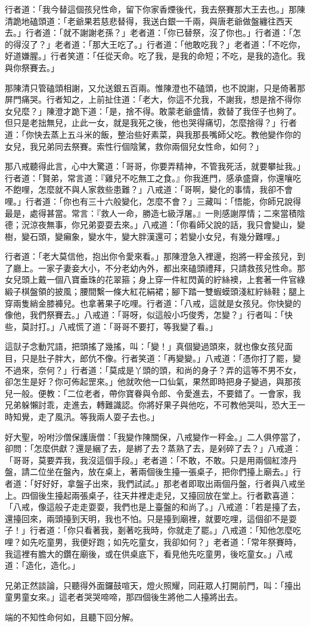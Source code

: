 行者道：「我今替這個孩兒性命，留下你家香煙後代，我去祭賽那大王去也。」那陳清跪地磕頭道：「老爺果若慈悲替得，我送白銀一千兩，與唐老爺做盤纏往西天去。」行者道：「就不謝謝老孫？」老者道：「你已替祭，沒了你也。」行者道：「怎的得沒了？」老者道：「那大王吃了。」行者道：「他敢吃我？」老者道：「不吃你，好道嫌腥。」行者笑道：「任從天命。吃了我，是我的命短；不吃，是我的造化。我與你祭賽去。」

那陳清只管磕頭相謝，又允送銀五百兩。惟陳澄也不磕頭，也不說謝，只是倚著那屏門痛哭。行者知之，上前扯住道：「老大，你這不允我，不謝我，想是捨不得你女兒麼？」陳澄才跪下道：「是，捨不得。敢蒙老爺盛情，救替了我侄子也夠了。但只是老拙無兒，止此一女，就是我死之後，他也哭得痛切，怎麼捨得？」行者道：「你快去蒸上五斗米的飯，整治些好素菜，與我那長嘴師父吃。教他變作你的女兒，我兄弟同去祭賽。索性行個陰騭，救你兩個兒女性命，如何？」

那八戒聽得此言，心中大驚道：「哥哥，你要弄精神，不管我死活，就要攀扯我。」行者道：「賢弟，常言道：『雞兒不吃無工之食。』你我進門，感承盛齋，你還嚷吃不飽哩，怎麼就不與人家救些患難？」八戒道：「哥啊，變化的事情，我卻不會哩。」行者道：「你也有三十六般變化，怎麼不會？」三藏叫：「悟能，你師兄說得最是，處得甚當。常言：『救人一命，勝造七級浮屠。』一則感謝厚情；二來當積陰德；況涼夜無事，你兄弟耍耍去來。」八戒道：「你看師父說的話，我只會變山，變樹，變石頭，變癩象，變水牛，變大胖漢還可；若變小女兒，有幾分難哩。」

行者道：「老大莫信他，抱出你令愛來看。」那陳澄急入裡邊，抱將一秤金孩兒，到了廳上。一家子妻妾大小，不分老幼內外，都出來磕頭禮拜，只請救孩兒性命。那女兒頭上戴一個八寶垂珠的花翠箍；身上穿一件紅閃黃的紵絲襖，上套著一件官綠緞子棋盤領的披風；腰間繫一條大紅花絹裙；腳下踏一雙蝦蟆頭淺紅紵絲鞋；腿上穿兩隻綃金膝褲兒。也拿著果子吃哩。行者道：「八戒，這就是女孩兒。你快變的像他，我們祭賽去。」八戒道：「哥呀，似這般小巧俊秀，怎變？」行者叫：「快些，莫討打。」八戒慌了道：「哥哥不要打，等我變了看。」

這獃子念動咒語，把頭搖了幾搖，叫：「變！」真個變過頭來，就也像女孩兒面目，只是肚子胖大，郎伉不像。行者笑道：「再變變。」八戒道：「憑你打了罷，變不過來，奈何？」行者道：「莫成是丫頭的頭，和尚的身子？弄的這等不男不女，卻怎生是好？你可佈起罡來。」他就吹他一口仙氣，果然即時把身子變過，與那孩兒一般。便教：「二位老者，帶你寶眷與令郎、令愛進去，不要錯了。一會家，我兄弟躲懶討乖，走進去，轉難識認。你將好果子與他吃，不可教他哭叫，恐大王一時知覺，走了風汛。等我兩人耍子去也。」

好大聖，吩咐沙僧保護唐僧：「我變作陳關保，八戒變作一秤金。」二人俱停當了，卻問：「怎麼供獻？還是綑了去，是綁了去？蒸熟了去，是剁碎了去？」八戒道：「哥哥，莫要弄我，我沒這個手段。」老者道：「不敢，不敢。只是用兩個紅漆丹盤，請二位坐在盤內，放在桌上，著兩個後生擡一張桌子，把你們擡上廟去。」行者道：「好好好，拿盤子出來，我們試試。」那老者即取出兩個丹盤，行者與八戒坐上。四個後生擡起兩張桌子，往天井裡走走兒，又擡回放在堂上。行者歡喜道：「八戒，像這般子走走耍耍，我們也是上臺盤的和尚了。」八戒道：「若是擡了去，還擡回來，兩頭擡到天明，我也不怕。只是擡到廟裡，就要吃哩，這個卻不是耍子！」行者道：「你只看著我，剗著吃我時，你就走了罷。」八戒道：「知他怎麼吃哩？如先吃童男，我便好跑；如先吃童女，我卻如何？」老者道：「常年祭賽時，我這裡有膽大的鑽在廟後，或在供桌底下，看見他先吃童男，後吃童女。」八戒道：「造化，造化。」

兄弟正然談論，只聽得外面鑼鼓喧天，燈火照耀，同莊眾人打開前門，叫：「擡出童男童女來。」這老者哭哭啼啼，那四個後生將他二人擡將出去。

端的不知性命何如，且聽下回分解。

